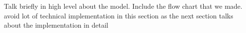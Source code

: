 Talk briefly in high level about the model.
Include the flow chart that we made.
avoid lot of technical implementation in this section as the next section talks about the implementation in detail